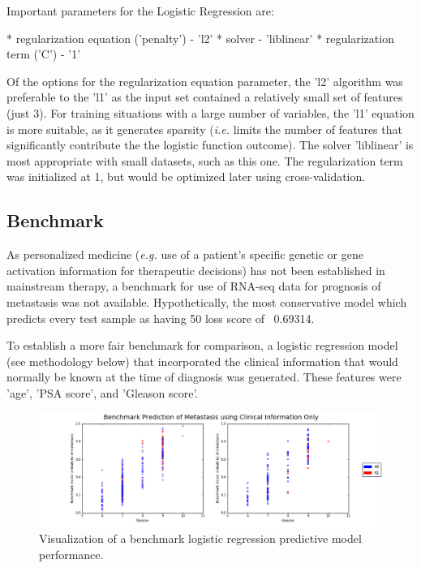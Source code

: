 \documentclass[final]{article}
\begin{document}
Important parameters for the Logistic Regression are:

* regularization equation ('penalty') - 'l2'
* solver - 'liblinear'
* regularization term ('C') - '1'

Of the options for the regularization equation parameter, the 'l2' algorithm was
preferable to the 'l1' as the input set contained a relatively small set of
features  (just 3).  For training situations with a large number of variables,
the 'l1' equation is more suitable, as it generates sparsity (\textit{i.e.} limits the
number of features that  significantly contribute the the logistic function
outcome).  The solver 'liblinear' is most appropriate with small datasets, such
as this one.  The regularization term  was initialized at 1, but would be
optimized later using cross-validation.


\subsection{Benchmark}

As personalized medicine (\textit{e.g.} use of a patient's specific genetic or gene
activation information for therapeutic decisions) has not been established in
mainstream therapy, a benchmark for use of RNA-seq data for prognosis of
metastasis was not available.  Hypothetically, the most conservative model which
predicts every test sample as having 50%
loss score of ~0.69314.

To establish a more fair benchmark for comparison, a logistic regression model
(see methodology below) that incorporated the clinical information that would
normally be known at the time of diagnosis was generated.  These features were
'age', 'PSA score', and 'Gleason score'.

\begin{figure}[h]
  \centering
  \includegraphics[width=\textwidth]{benchmark}
  \caption{Visualization of a benchmark logistic regression predictive model performance.\label{fig:benchScat}}
\end{figure}
\end{document}
